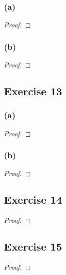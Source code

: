 \documentclass[14pt]{extarticle}
\begin{document}
\subsubsection{(a)}

\begin{proof}

\end{proof}

\subsubsection{(b)}

\begin{proof}

\end{proof}

\subsection{Exercise 13}

\subsubsection{(a)}

\begin{proof}

\end{proof}

\subsubsection{(b)}

\begin{proof}

\end{proof}

\subsection{Exercise 14}

\begin{proof}

\end{proof}

\subsection{Exercise 15}

\begin{proof}

\end{proof}
\end{document}
